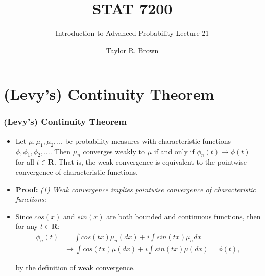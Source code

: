 \documentclass[handout]{beamer}
\title{STAT 7200}
\subtitle{Introduction to Advanced Probability \newline Lecture 21}
\author{Taylor R. Brown}
\institute{}
\date{}
\begin{document}
\frame{\titlepage}


\section[Outline]{}
\frame{\tableofcontents}

\section{(Levy's) Continuity Theorem} 


\frame
{
  \frametitle{(Levy's) Continuity Theorem} 

 \begin{itemize}
 
\item<1->[] \begin{Theorem} Let $\mu, \mu_1, \mu_2,\ldots$  be probability measures with characteristic functions $\phi, \phi_1, \phi_2,\ldots$. Then $\mu_n$ converges weakly to $\mu$ if and only if $\phi_n(t)\rightarrow \phi(t)$ for all $t \in \mathbf{R}$.  That is, the weak convergence is equivalent to the pointwise convergence of characteristic functions. \end{Theorem}

\item<2-> \textbf{Proof:} \textit{(1) Weak convergence implies pointwise convergence of characteristic functions:}
\item<3->[-] Since $cos(x)$ and $sin(x)$ are both bounded and continuous functions, then for any $t\in \mathbf{R}:$
\begin{align*}
\phi_n(t)& =\int cos(tx) \mu_n(dx)+i \int sin(tx)\mu_n dx \\
&\rightarrow \int cos(tx) \mu (dx)+i \int sin(tx) \mu(dx)=\phi(t),
\end{align*}

\noindent by the definition of weak convergence. 

\end{itemize}
}
\end{document}
